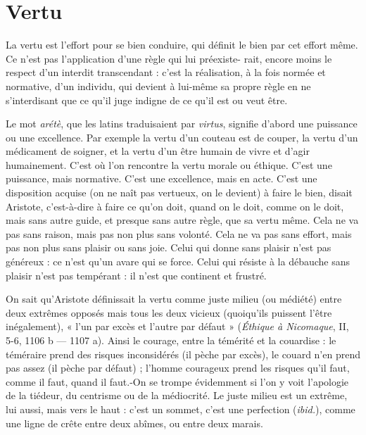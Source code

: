 \section{Vertu}
La vertu est l'effort pour se bien conduire, qui définit le bien par cet
effort même. Ce n’est pas l'application d’une règle qui lui préexiste-
rait, encore moins le respect d’un interdit transcendant : c’est la réalisation, à la
fois normée et normative, d’un individu, qui devient à lui-même sa propre
règle en ne s’interdisant que ce qu’il juge indigne de ce qu’il est ou veut être.

Le mot {\it arétè}, que les latins traduisaient par {\it virtus}, signifie d’abord une puissance
ou une excellence. Par exemple la vertu d’un couteau est de couper, la
vertu d’un médicament de soigner, et la vertu d’un être humain de vivre et
d’agir humainement. C’est où l’on rencontre la vertu morale ou éthique. C’est
une puissance, mais normative. C’est une excellence, mais en acte. C’est une
disposition acquise (on ne naît pas vertueux, on le devient) à faire le bien, disait
Aristote, c’est-à-dire à faire ce qu’on doit, quand on le doit, comme on le doit,
mais sans autre guide, et presque sans autre règle, que sa vertu même. Cela ne
va pas sans raison, mais pas non plus sans volonté. Cela ne va pas sans effort,
mais pas non plus sans plaisir ou sans joie. Celui qui donne sans plaisir n’est pas
généreux : ce n’est qu’un avare qui se force. Celui qui résiste à la débauche sans
plaisir n’est pas tempérant : il n’est que continent et frustré.

On sait qu’Aristote définissait la vertu comme juste milieu (ou médiété) entre
deux extrêmes opposés mais tous les deux vicieux (quoiqu’ils puissent l'être inégalement),
« l'un par excès et l’autre par défaut » ({\it Éthique à Nicomaque}, II, 5-6,
1106 b — 1107 a). Ainsi le courage, entre la témérité et la couardise : le téméraire
prend des risques inconsidérés (il pèche par excès), le couard n’en prend pas assez
(il pèche par défaut) ; l'homme courageux prend les risques qu’il faut, comme il
faut, quand il faut.-On se trompe évidemment si l’on y voit l’apologie de la tiédeur,
du centrisme ou de la médiocrité. Le juste milieu est un extrême, lui aussi,
mais vers le haut : c’est un sommet, c’est une perfection ({\it ibid.}), comme une ligne
de crête entre deux abîmes, ou entre deux marais.

